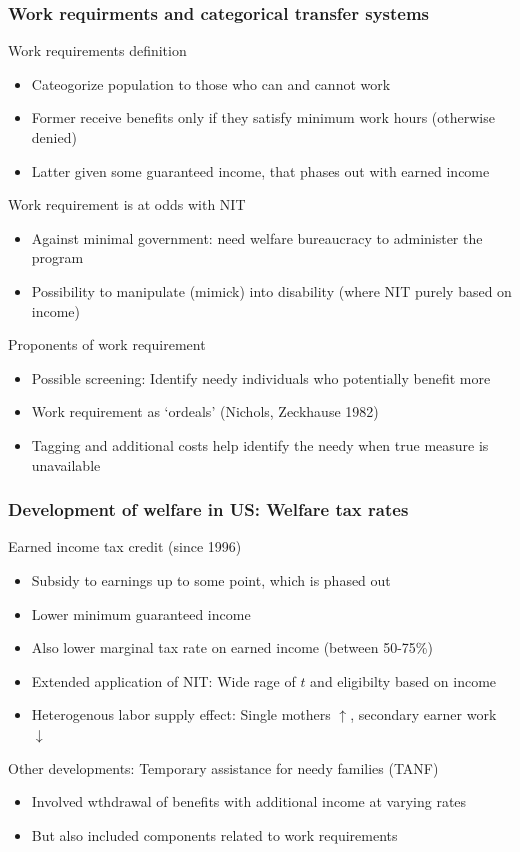 \documentclass[aspectratio=169]{beamer}
\begin{document}
\begin{frame}
\frametitle{Work requirments and categorical transfer systems} 
Work requirements definition
\begin{itemize}\setlength\itemsep{3pt}
\item  Cateogorize population to those who can and cannot work
\item Former receive benefits only if they satisfy minimum work hours (otherwise denied)
\item Latter given some guaranteed income, that phases out with earned income
\end{itemize}\medskip
Work requirement is at odds with NIT
\begin{itemize}\setlength\itemsep{3pt}
\item Against minimal government: need welfare bureaucracy to administer the program
\item Possibility to manipulate (mimick) into disability (where NIT purely based on income)
\end{itemize} \medskip
Proponents of work requirement
\begin{itemize}\setlength\itemsep{3pt}
\item Possible screening: Identify needy individuals who potentially benefit more
\item Work requirement as `ordeals' (Nichols, Zeckhause 1982)
\item Tagging and additional costs help identify the needy when true measure is unavailable
\end{itemize}
\end{frame}




\begin{frame}
\frametitle{Development of welfare in US: Welfare tax rates} 
Earned income tax credit (since 1996)
\begin{itemize}\setlength\itemsep{3pt}
\item Subsidy to earnings up to some point, which is phased out
\item Lower minimum guaranteed income
\item Also lower marginal tax rate on earned income (between 50-75\%)
\item Extended application of NIT: Wide rage of $t$ and eligibilty based on income
\item Heterogenous labor supply effect: Single mothers $\uparrow$, secondary earner work $\downarrow$
\end{itemize}\medskip
Other developments: Temporary assistance for needy families (TANF)
\begin{itemize}\setlength\itemsep{3pt}
\item Involved wthdrawal of benefits with additional income at varying rates
\item But also included components related to work requirements
\end{itemize}
\end{frame}
\end{document}
